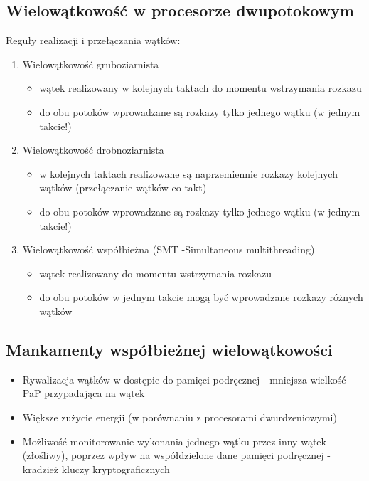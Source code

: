 \documentclass[a4paper,twoside]{article}
\begin{document}
		\subsection*{Wielowątkowość w procesorze dwupotokowym}
		Reguły realizacji i przełączania wątków:
		\begin{enumerate}
			\item Wielowątkowość gruboziarnista
			\begin{itemize}
				\item wątek realizowany w kolejnych taktach do momentu wstrzymania rozkazu
				\item do obu potoków wprowadzane są rozkazy tylko jednego wątku (w jednym takcie!)
			\end{itemize}
			\item Wielowątkowość drobnoziarnista
			\begin{itemize}
				\item w kolejnych taktach realizowane są naprzemiennie rozkazy kolejnych wątków (przełączanie wątków co takt)
				\item do obu potoków wprowadzane są rozkazy tylko jednego wątku (w jednym takcie!)
			\end{itemize}
			\item Wielowątkowość współbieżna (SMT -Simultaneous multithreading)
			\begin{itemize}
				\item wątek realizowany do momentu wstrzymania rozkazu
				\item do obu potoków w jednym takcie mogą być wprowadzane rozkazy różnych wątków
			\end{itemize}
		\end{enumerate}
		\subsection*{Mankamenty współbieżnej wielowątkowości}
		\begin{itemize}
			\item Rywalizacja wątków w dostępie do pamięci podręcznej - mniejsza wielkość PaP przypadająca na wątek
			\item Większe zużycie energii (w porównaniu z procesorami dwurdzeniowymi)
			\item Możliwość monitorowanie wykonania jednego wątku przez inny wątek (złośliwy), poprzez wpływ na współdzielone dane pamięci podręcznej - kradzież kluczy kryptograficznych
		\end{itemize}
	
\end{document}

